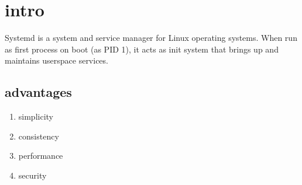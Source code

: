 \section{intro}
Systemd is a system and service manager for Linux operating systems.
When run as first process on boot (as PID 1), it acts as init system
that brings up and maintains userspace services.

\subsection{advantages}
\begin{enumerate}
	\item simplicity
	\item consistency
	\item performance
	\item security
\end{enumerate}
